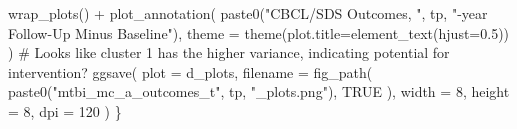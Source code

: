 \documentclass[
  letterpaper,
  DIV=11,
  numbers=noendperiod]{scrreprt}
\newenvironment{Shaded}{\begin{snugshade}}{\end{snugshade}}
\newcommand{\AttributeTok}[1]{\textcolor[rgb]{0.40,0.45,0.13}{#1}}
\newcommand{\CommentTok}[1]{\textcolor[rgb]{0.37,0.37,0.37}{#1}}
\newcommand{\ConstantTok}[1]{\textcolor[rgb]{0.56,0.35,0.01}{#1}}
\newcommand{\DecValTok}[1]{\textcolor[rgb]{0.68,0.00,0.00}{#1}}
\newcommand{\FloatTok}[1]{\textcolor[rgb]{0.68,0.00,0.00}{#1}}
\newcommand{\FunctionTok}[1]{\textcolor[rgb]{0.28,0.35,0.67}{#1}}
\newcommand{\NormalTok}[1]{\textcolor[rgb]{0.00,0.23,0.31}{#1}}
\newcommand{\SpecialCharTok}[1]{\textcolor[rgb]{0.37,0.37,0.37}{#1}}
\newcommand{\StringTok}[1]{\textcolor[rgb]{0.13,0.47,0.30}{#1}}
\begin{document}
\begin{Shaded}
\begin{Highlighting}[]
        \FunctionTok{wrap\_plots}\NormalTok{() }\SpecialCharTok{+}
        \FunctionTok{plot\_annotation}\NormalTok{(}
            \FunctionTok{paste0}\NormalTok{(}\StringTok{"CBCL/SDS Outcomes, "}\NormalTok{, tp, }\StringTok{"{-}year Follow{-}Up Minus Baseline"}\NormalTok{),}
            \AttributeTok{theme =} \FunctionTok{theme}\NormalTok{(}\AttributeTok{plot.title=}\FunctionTok{element\_text}\NormalTok{(}\AttributeTok{hjust=}\FloatTok{0.5}\NormalTok{))}
\NormalTok{        )}
    \CommentTok{\# Looks like cluster 1 has the higher variance, indicating potential for intervention?}
    \FunctionTok{ggsave}\NormalTok{(}
        \AttributeTok{plot =}\NormalTok{ d\_plots,}
        \AttributeTok{filename =} \FunctionTok{fig\_path}\NormalTok{(}
            \FunctionTok{paste0}\NormalTok{(}\StringTok{"mtbi\_mc\_a\_outcomes\_t"}\NormalTok{, tp, }\StringTok{"\_plots.png"}\NormalTok{),}
            \ConstantTok{TRUE}
\NormalTok{        ),}
        \AttributeTok{width =} \DecValTok{8}\NormalTok{,}
        \AttributeTok{height =} \DecValTok{8}\NormalTok{,}
        \AttributeTok{dpi =} \DecValTok{120}
\NormalTok{    )}
\NormalTok{\}}


\end{Highlighting}
\end{Shaded}
\end{document}

